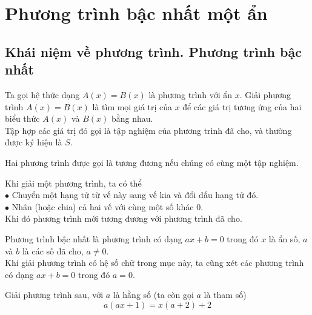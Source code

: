 \chapter{Phương trình bậc nhất một ẩn}
\section{Khái niệm về phương trình. Phương trình bậc nhất}
\begin{enumEX}{1}
\item Ta gọi hệ thức dạng $A(x)=B(x)$ là phương trình với ẩn $x$. Giải phương trình $A(x)=B(x)$ là tìm mọi giá trị của $x$ để các giá trị tương ứng của hai biểu thức $A(x)$ và $B(x)$ bằng nhau.\\
Tập hợp các giá trị đó gọi là tập nghiệm của phương trình đã cho, và thường được ký hiệu là $S$.
\item Hai phương trình được gọi là tương đương nếu chúng có cùng một tập nghiệm.
\item Khi giải một phương trình, ta có thể\\
$\bullet$ Chuyển một hạng tử từ vế này sang vế kia và đổi dấu hạng tử đó.\\
$\bullet$ Nhân (hoặc chia) cả hai vế với cùng một số khác $0$.\\
Khi đó phương trình mới tương đương với phương trình đã cho.
\item Phương trình bậc nhất là phương trình có dạng $ax+b=0$ trong đó $x$ là ẩn số, $a$ và $b$ là các số đã cho, $a\ne 0$.\\
Khi giải phương trình có hệ số chữ trong mục này, ta cũng xét các phương trình có dạng $ax+b=0$ trong đó $a=0$.
\end{enumEX}

\begin{vd}%
	Giải phương trình sau, với $a$ là hằng số (ta còn gọi $a$ là tham số)
	\[a(ax+1)=x(a+2)+2\]
\end{vd}


